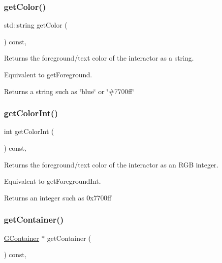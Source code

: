 \subsubsection{\texorpdfstring{get\+Color()}{getColor()}}
{\footnotesize\ttfamily std\+::string get\+Color (\begin{DoxyParamCaption}{ }\end{DoxyParamCaption}) const\hspace{0.3cm}{\ttfamily [virtual]}, {\ttfamily [inherited]}}



Returns the foreground/text color of the interactor as a string. 

Equivalent to get\+Foreground. \begin{DoxyReturn}{Returns}
a string such as \char`\"{}blue\char`\"{} or \char`\"{}\#7700ff\char`\"{} 
\end{DoxyReturn}
\mbox{\label{classsgl_1_1GInteractor_a9635c7af766cdc3417f346683fa0e6c1}} 
\subsubsection{\texorpdfstring{get\+Color\+Int()}{getColorInt()}}
{\footnotesize\ttfamily int get\+Color\+Int (\begin{DoxyParamCaption}{ }\end{DoxyParamCaption}) const\hspace{0.3cm}{\ttfamily [virtual]}, {\ttfamily [inherited]}}



Returns the foreground/text color of the interactor as an R\+GB integer. 

Equivalent to get\+Foreground\+Int. \begin{DoxyReturn}{Returns}
an integer such as 0x7700ff 
\end{DoxyReturn}
\mbox{\label{classsgl_1_1GInteractor_a7a6e317c29d61030929b4cd2d1c00fe7}} 
\subsubsection{\texorpdfstring{get\+Container()}{getContainer()}}
{\footnotesize\ttfamily \mbox{\hyperlink{classsgl_1_1GContainer}{G\+Container}} $\ast$ get\+Container (\begin{DoxyParamCaption}{ }\end{DoxyParamCaption}) const\hspace{0.3cm}{\ttfamily [virtual]}, {\ttfamily [inherited]}}



